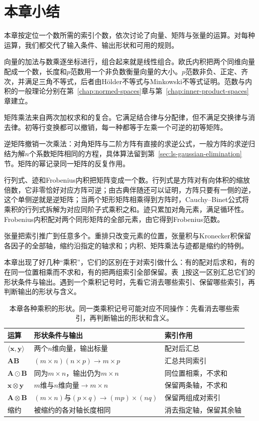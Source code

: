 \section{本章小结}
\label{sec:ls-operations-summary}

本章按定位一个数所需的索引个数，依次讨论了向量、矩阵与张量的运算。对每种运算，我们都交代了输入条件、输出形状和可用的规则。

向量的加法与数乘逐坐标进行，组合起来就是线性组合。欧氏内积把两个同维向量配成一个数，长度和$p$范数用一个非负数衡量向量的大小。$p$范数非负、正定、齐次，并满足三角不等式，后者由Hölder不等式与Minkowski不等式证明。范数与内积的一般理论分别在第~\ref{chap:normed-spaces}章与第~\ref{chap:inner-product-spaces}章建立。

矩阵乘法来自两次加权求和的复合。它满足结合律与分配律，但不满足交换律与消去律。初等行变换都可以撤销，每一种都等于左乘一个可逆的初等矩阵。

逆矩阵撤销一次乘法：对角矩阵与二阶方阵有直接的求逆公式，一般方阵的求逆归结为解$n$个系数矩阵相同的方程，具体算法留到第~\ref{sec:ls-gaussian-elimination}节。矩阵的幂记录同一矩阵的反复作用。

行列式、迹和Frobenius内积把矩阵变成一个数。行列式是方阵对有向体积的缩放倍数，它非零恰好对应方阵可逆；由古典伴随还可以证明，方阵只要有一侧的逆，这个单侧逆就是逆矩阵；当两个矩形矩阵相乘得到方阵时，Cauchy--Binet公式将乘积的行列式拆解为对应同阶子式乘积之和。迹只累加对角元素，满足循环性。Frobenius内积配对两个同形矩阵的全部元素，由它得到Frobenius范数。

张量把索引推广到任意多个。重排只改变元素的位置，张量积与Kronecker积保留各因子的全部轴，缩约沿指定的轴求和；内积、矩阵乘法与迹都是缩约的特例。

本章出现了好几种“乘积”，它们的区别在于对索引做什么：有的配对后求和，有的在同一位置相乘而不求和，有的把两组索引全部保留。表~\ref{tab:linear-algebra-products-and-shapes}按这一区别汇总它们的形状条件与输出。遇到一个乘积记号时，先看它消去哪些索引、保留哪些索引，再判断输出的形状与含义。

\begin{table}[htbp]
 \centering\small
 \begin{tabularx}{\linewidth}{@{}lXX@{}}
  \toprule
  运算 & 形状条件与输出 & 索引作用\\
  \midrule
  $\langle\bm x,\bm y\rangle$ & 两个$n$维向量，输出标量 & 配对后汇总\\
  $\bm A\bm B$ & $(m\times n)(n\times p)\to m\times p$ & 汇总共同索引\\
  $\bm A\odot\bm B$ & 同为$m\times n$，输出仍为$m\times n$ & 同位置相乘，不求和\\
  $\bm x\otimes\bm y$ & $m$维与$n$维向量$\to m\times n$ & 保留两条轴，不求和\\
  $\bm A\otimes\bm B$ & $(m\times n)$与$(p\times q)\to(mp)\times(nq)$ & 保留两组成对索引\\
  缩约 & 被缩约的各对轴长度相同 & 消去指定轴，保留其余轴\\
  \bottomrule
 \end{tabularx}
 \caption{本章各种乘积的形状。同一类乘积记号可能对应不同操作：先看消去哪些索引，再判断输出的形状和含义。}
 \label{tab:linear-algebra-products-and-shapes}
\end{table}


